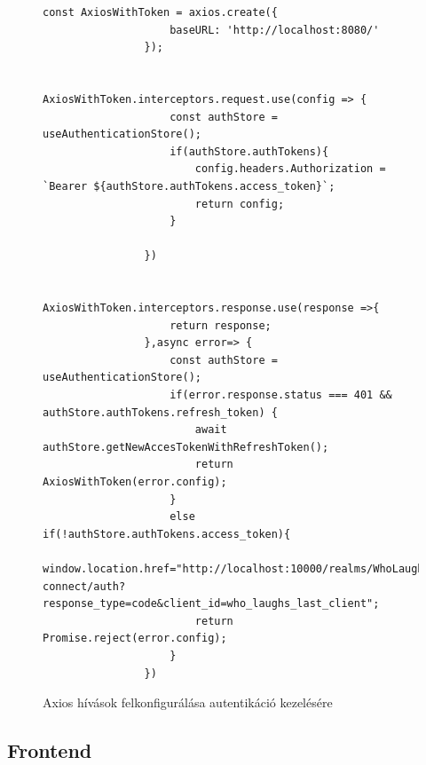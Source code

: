 \documentclass[a4paper,twoside]{article}
\begin{document}
\begin{figure}
 	\caption{Axios hívások felkonfigurálása autentikáció kezelésére}
 	
 		\begin{minipage}{\textwidth}
 			\begin{lstlisting}[style=javascriptStyle]
 				const AxiosWithToken = axios.create({
 					baseURL: 'http://localhost:8080/'
 				});
 				
 				AxiosWithToken.interceptors.request.use(config => {
 					const authStore = useAuthenticationStore();
 					if(authStore.authTokens){
 						config.headers.Authorization = `Bearer ${authStore.authTokens.access_token}`;
 						return config;
 					}
 					
 				})
 				
 				AxiosWithToken.interceptors.response.use(response =>{
 					return response;
 				},async error=> {
 					const authStore = useAuthenticationStore();
 					if(error.response.status === 401 && authStore.authTokens.refresh_token) {
 						await authStore.getNewAccesTokenWithRefreshToken();
 						return AxiosWithToken(error.config);
 					}
 					else if(!authStore.authTokens.access_token){
 						window.location.href="http://localhost:10000/realms/WhoLaughsLast/protocol/openid-connect/auth?response_type=code&client_id=who_laughs_last_client";
 						return Promise.reject(error.config);
 					}
 				})
 			\end{lstlisting}
 		\end{minipage}
 	
 	\label{axiosConfig}
\end{figure}
\FloatBarrier

\newpage

\subsection{Frontend}
\end{document}
